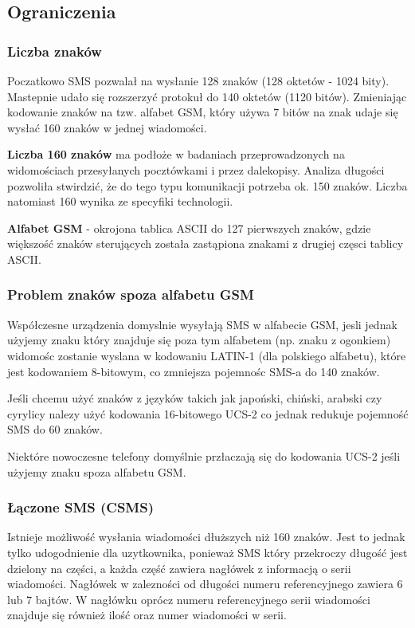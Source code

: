 \documentclass[xcolor=table]{beamer}
\begin{document}
\subsection{Ograniczenia}
\begin{frame}[allowframebreaks]
  \frametitle{Liczba znaków}

  Poczatkowo SMS pozwalał na wysłanie 128 znaków (128 oktetów - 1024 bity).
  Mastepnie udało się rozszerzyć protokuł do 140 oktetów (1120 bitów).
  Zmieniając kodowanie znaków na tzw. alfabet GSM, który używa 7 bitów na znak
  udaje się wysłać 160 znaków w jednej wiadomości.

  \textbf{Liczba 160 znaków} ma podłoże w badaniach przeprowadzonych na
  widomościach przesyłanych pocztówkami i przez dalekopisy. Analiza długości
  pozwoliła stwirdzić, że do tego typu komunikacji potrzeba ok. 150 znaków.
  Liczba natomiast 160 wynika ze specyfiki technologii.

  \framebreak

  \textbf{Alfabet GSM} - okrojona tablica ASCII do 127 pierwszych znaków, gdzie
  większość znaków sterujących została zastąpiona znakami z drugiej częsci
  tablicy ASCII.

\end{frame}
\begin{frame}
  \frametitle{Problem znaków spoza alfabetu GSM}

  Współczesne urządzenia domyslnie wysyłają SMS w alfabecie GSM, jesli jednak
  użyjemy znaku który znajduje się poza tym alfabetem (np. znaku z ogonkiem)
  widomośc zostanie wyslana w kodowaniu LATIN-1 (dla polskiego alfabetu), które
  jest kodowaniem 8-bitowym, co zmniejsza pojemnośc SMS-a do 140 znaków.

  Jeśli chcemu użyć znaków z języków takich jak japoński, chiński, arabski czy
  cyrylicy nalezy użyć kodowania 16-bitowego UCS-2 co jednak redukuje pojemność
  SMS do 60 znaków.

  Niektóre nowoczesne telefony domyślnie przłaczają się do kodowania UCS-2
  jeśli użyjemy znaku spoza alfabetu GSM.
\end{frame}

\begin{frame}
  \frametitle{Łączone SMS (CSMS)}

  Istnieje możliwość wysłania wiadomości dłuższych niż 160 znaków. Jest to
  jednak tylko udogodnienie dla uzytkownika, ponieważ SMS który przekroczy
  długość jest dzielony na części, a każda część zawiera nagłówek z informacją
  o serii wiadomości. Nagłówek w zalezności od długości numeru referencyjnego
  zawiera 6 lub 7 bajtów. W nagłówku oprócz numeru referencyjnego serii
  wiadomości znajduje się również ilość oraz numer wiadomości w serii.

\end{frame}
\end{document}
